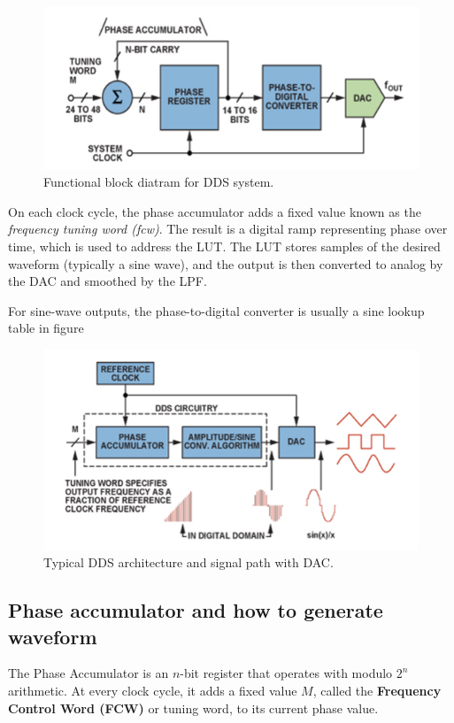 \begin{figure}[H]
	\centering
	\includegraphics[width=.8\linewidth]{./my-chapters/my-images/theoretical_background/DDS_blockdiagram.png}
	\caption{Functional block diatram for DDS system.}
	\label{fig: DDS_blockdiagram}
\end{figure}

On each clock cycle, the phase accumulator adds a fixed value known as the \textit{frequency tuning word (fcw)}. The result is a digital ramp representing phase over time, which is used to address the LUT. The LUT stores samples of the desired waveform (typically a sine wave), and the output is then converted to analog by the DAC and smoothed by the LPF.

For sine-wave outputs, the phase-to-digital converter is usually a sine lookup table in figure 

\begin{figure}[H]
	\centering
	\includegraphics[width=.8\linewidth]{./my-chapters/my-images/theoretical_background/DDS_architecture.png}
	\caption{Typical DDS architecture and signal path with DAC.}
	\label{fig: DDS_architecture}
\end{figure}

\subsection{Phase accumulator and how to generate waveform}

The Phase Accumulator is an $n$-bit register that operates with modulo $2^n$ arithmetic. 
At every clock cycle, it adds a fixed value $M$, called the \textbf{Frequency Control Word (FCW)} or tuning word, to its current phase value.

